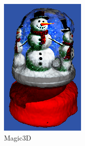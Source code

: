 \begin{figure}[ht]
\begin{subfigure}[b]{0.188\textwidth}
        \includegraphics[width=\textwidth]{etc/a detailed rendering of a snow globe containing a snowman/magic3d/faces/59_part1.png}
        \vspace{0.1cm}
        \caption{Magic3D}
    \end{subfigure}
    \begin{subfigure}[b]{0.22\textwidth}
        \centering

\end{subfigure}
\end{figure}
